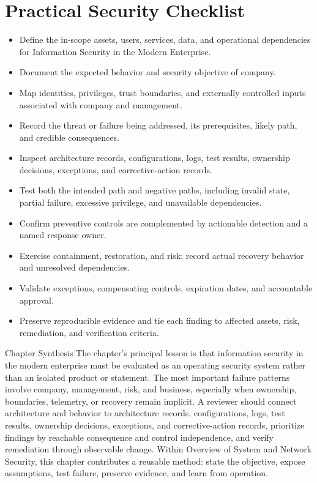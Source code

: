 \documentclass[11pt,letterpaper]{article}
\begin{document}
\section*{Practical Security Checklist}
\begin{itemize}[label=$\square$]
\item Define the in-scope assets, users, services, data, and operational dependencies for Information Security in the Modern Enterprise.
\item Document the expected behavior and security objective of company.
\item Map identities, privileges, trust boundaries, and externally controlled inputs associated with company and management.
\item Record the threat or failure being addressed, its prerequisites, likely path, and credible consequences.
\item Inspect architecture records, configurations, logs, test results, ownership decisions, exceptions, and corrective-action records.
\item Test both the intended path and negative paths, including invalid state, partial failure, excessive privilege, and unavailable dependencies.
\item Confirm preventive controls are complemented by actionable detection and a named response owner.
\item Exercise containment, restoration, and risk; record actual recovery behavior and unresolved dependencies.
\item Validate exceptions, compensating controls, expiration dates, and accountable approval.
\item Preserve reproducible evidence and tie each finding to affected assets, risk, remediation, and verification criteria.
\end{itemize}
\begin{CornellSummaryBox}{Chapter Synthesis}
The chapter's principal lesson is that information security in the modern enterprise must be evaluated as an operating security system rather than an isolated product or statement. The most important failure patterns involve company, management, risk, and business, especially when ownership, boundaries, telemetry, or recovery remain implicit. A reviewer should connect architecture and behavior to architecture records, configurations, logs, test results, ownership decisions, exceptions, and corrective-action records, prioritize findings by reachable consequence and control independence, and verify remediation through observable change. Within Overview of System and Network Security, this chapter contributes a reusable method: state the objective, expose assumptions, test failure, preserve evidence, and learn from operation.
\end{CornellSummaryBox}
\end{document}
